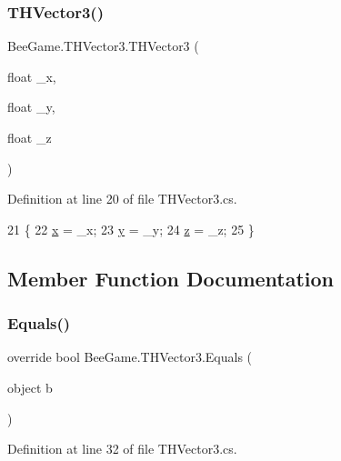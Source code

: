 \subsubsection{\texorpdfstring{T\+H\+Vector3()}{THVector3()}\hspace{0.1cm}{\footnotesize\ttfamily [2/2]}}
{\footnotesize\ttfamily Bee\+Game.\+T\+H\+Vector3.\+T\+H\+Vector3 (\begin{DoxyParamCaption}\item[{float}]{\+\_\+x,  }\item[{float}]{\+\_\+y,  }\item[{float}]{\+\_\+z }\end{DoxyParamCaption})}



Definition at line 20 of file T\+H\+Vector3.\+cs.


\begin{DoxyCode}
21         \{
22             \hyperlink{struct_bee_game_1_1_t_h_vector3_a3a414a33eefb779cc52428463f428b6d}{x} = \_x;
23             \hyperlink{struct_bee_game_1_1_t_h_vector3_a58f88e615565042dbab4e4ba6ab1b3a6}{y} = \_y;
24             \hyperlink{struct_bee_game_1_1_t_h_vector3_a56c61f039a2cdabc8a371d2faa9838fa}{z} = \_z;
25         \}
\end{DoxyCode}


\subsection{Member Function Documentation}
\mbox{\label{struct_bee_game_1_1_t_h_vector3_af9efb591754dc8ec5994333babeed7d6}} 
\subsubsection{\texorpdfstring{Equals()}{Equals()}}
{\footnotesize\ttfamily override bool Bee\+Game.\+T\+H\+Vector3.\+Equals (\begin{DoxyParamCaption}\item[{object}]{b }\end{DoxyParamCaption})}



Definition at line 32 of file T\+H\+Vector3.\+cs.


